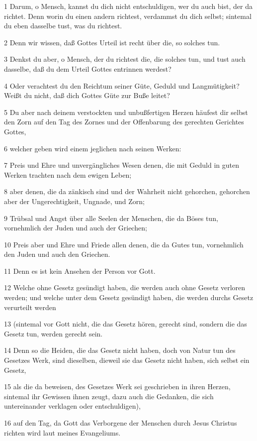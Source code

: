 \par 1 Darum, o Mensch, kannst du dich nicht entschuldigen, wer du auch bist, der da richtet. Denn worin du einen andern richtest, verdammst du dich selbst; sintemal du eben dasselbe tust, was du richtest.
\par 2 Denn wir wissen, daß Gottes Urteil ist recht über die, so solches tun.
\par 3 Denkst du aber, o Mensch, der du richtest die, die solches tun, und tust auch dasselbe, daß du dem Urteil Gottes entrinnen werdest?
\par 4 Oder verachtest du den Reichtum seiner Güte, Geduld und Langmütigkeit? Weißt du nicht, daß dich Gottes Güte zur Buße leitet?
\par 5 Du aber nach deinem verstockten und unbußfertigen Herzen häufest dir selbst den Zorn auf den Tag des Zornes und der Offenbarung des gerechten Gerichtes Gottes,
\par 6 welcher geben wird einem jeglichen nach seinen Werken:
\par 7 Preis und Ehre und unvergängliches Wesen denen, die mit Geduld in guten Werken trachten nach dem ewigen Leben;
\par 8 aber denen, die da zänkisch sind und der Wahrheit nicht gehorchen, gehorchen aber der Ungerechtigkeit, Ungnade, und Zorn;
\par 9 Trübsal und Angst über alle Seelen der Menschen, die da Böses tun, vornehmlich der Juden und auch der Griechen;
\par 10 Preis aber und Ehre und Friede allen denen, die da Gutes tun, vornehmlich den Juden und auch den Griechen.
\par 11 Denn es ist kein Ansehen der Person vor Gott.
\par 12 Welche ohne Gesetz gesündigt haben, die werden auch ohne Gesetz verloren werden; und welche unter dem Gesetz gesündigt haben, die werden durchs Gesetz verurteilt werden
\par 13 (sintemal vor Gott nicht, die das Gesetz hören, gerecht sind, sondern die das Gesetz tun, werden gerecht sein.
\par 14 Denn so die Heiden, die das Gesetz nicht haben, doch von Natur tun des Gesetzes Werk, sind dieselben, dieweil sie das Gesetz nicht haben, sich selbst ein Gesetz,
\par 15 als die da beweisen, des Gesetzes Werk sei geschrieben in ihren Herzen, sintemal ihr Gewissen ihnen zeugt, dazu auch die Gedanken, die sich untereinander verklagen oder entschuldigen),
\par 16 auf den Tag, da Gott das Verborgene der Menschen durch Jesus Christus richten wird laut meines Evangeliums.
